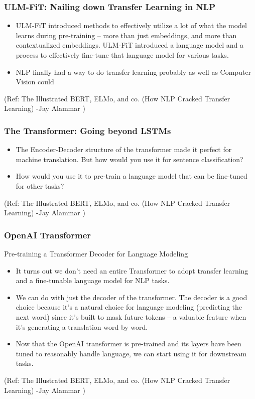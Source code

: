 \begin{frame}[fragile]\frametitle{ULM-FiT: Nailing down Transfer Learning in NLP}
\begin{itemize}
\item  ULM-FiT introduced methods to effectively utilize a lot of what the model learns during pre-training – more than just embeddings, and more than contextualized embeddings. ULM-FiT introduced a language model and a process to effectively fine-tune that language model for various tasks.
\item NLP finally had a way to do transfer learning probably as well as Computer Vision could
\end{itemize}


{\tiny (Ref: The Illustrated BERT, ELMo, and co. (How NLP Cracked Transfer Learning) -Jay Alammar )}
\end{frame}

\begin{frame}[fragile]\frametitle{The Transformer: Going beyond LSTMs}
\begin{itemize}
\item The Encoder-Decoder structure of the transformer made it perfect for machine translation. But how would you use it for sentence classification? 
\item How would you use it to pre-train a language model that can be fine-tuned for other tasks?
\end{itemize}


{\tiny (Ref: The Illustrated BERT, ELMo, and co. (How NLP Cracked Transfer Learning) -Jay Alammar )}
\end{frame}

\begin{frame}[fragile]\frametitle{OpenAI Transformer}
Pre-training a Transformer Decoder for Language Modeling 
\begin{itemize}
\item It turns out we don’t need an entire Transformer to adopt transfer learning and a fine-tunable language model for NLP tasks. 
\item We can do with just the decoder of the transformer. The decoder is a good choice because it’s a natural choice for language modeling (predicting the next word) since it’s built to mask future tokens – a valuable feature when it’s generating a translation word by word.
\item Now that the OpenAI transformer is pre-trained and its layers have been tuned to reasonably handle language, we can start using it for downstream tasks.
\end{itemize}


{\tiny (Ref: The Illustrated BERT, ELMo, and co. (How NLP Cracked Transfer Learning) -Jay Alammar )}
\end{frame}

